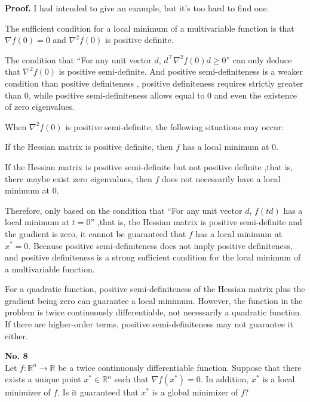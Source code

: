 \documentclass[a4paper, 11pt]{article}
\newenvironment{problem}[2][No.]
    { \begin{mdframed}[backgroundcolor=gray!5] \textbf{#1 #2} \\}
    {  \end{mdframed}}
\newenvironment{solution}
    {\textbf{Proof.}}
    {}
\begin{document}
\begin{solution}
	I had intended to give an example, but it's too hard to find one.
	
	The sufficient condition for a local minimum of a multivariable function is that $\nabla f(0) = 0$ and $\nabla^2 f(0)$ is positive definite.
	
	The condition that “For any unit vector $d$, $d^{\top}\nabla^2 f(0)d \geq 0$” can only deduce that $\nabla^2 f(0)$ is positive semi-definite. And positive semi-definiteness is a weaker condition than positive definiteness , positive definiteness requires strictly greater than 0, while positive semi-definiteness allows equal to 0 and even the existence of zero eigenvalues. 
	
	When $\nabla^2 f(0)$ is positive semi-definite, the following situations may occur:

	If the Hessian matrix is positive definite, then $f$ has a local minimum at 0.
	
	If the Hessian matrix is positive semi-definite but not positive definite ,that is, there maybe exist zero eigenvalues, then $f$ does not necessarily have a local minimum at 0.

	
	Therefore, only based on the condition that “For any unit vector $d$, $f(td)$ has a local minimum at $t = 0$” ,that is, the Hessian matrix is positive semi-definite and the gradient is zero, it cannot be guaranteed that $f$ has a local minimum at $x^* = 0$. Because positive semi-definiteness does not imply positive definiteness, and positive definiteness is a strong sufficient condition for the local minimum of a multivariable function.
	
	For a quadratic function, positive semi-definiteness of the Hessian matrix plus the gradient being zero can guarantee a local minimum. However, the function in the problem is twice continuously differentiable, not necessarily a quadratic function. If there are higher-order terms, positive semi-definiteness may not guarantee it either. 
\end{solution}
\begin{problem}{8}
	 Let \( f : \mathbb{R}^n \to \mathbb{R} \) be a twice continuously differentiable function. Suppose that there exists a unique point \( x^* \in \mathbb{R}^n \) such that \( \nabla f(x^*) = 0 \). In addition, \( x^* \) is a local minimizer of \( f \). Is it guaranteed that \( x^* \) is a global minimizer of \( f \)?
\end{problem}
\end{document}
